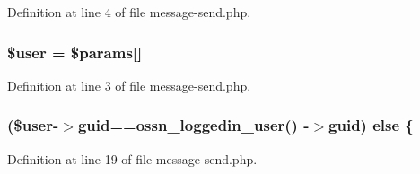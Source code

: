 Definition at line 4 of file message-\/send.\+php.

\subsubsection[{\texorpdfstring{\$user}{$user}}]{\setlength{\rightskip}{0pt plus 5cm}\${\bf user} = \$params\mbox{[}\textquotesingle{}\mbox{]}}\hypertarget{message-send_8php_a598ca4e71b15a1313ec95f0df1027ca5}{}\label{message-send_8php_a598ca4e71b15a1313ec95f0df1027ca5}


Definition at line 3 of file message-\/send.\+php.

\subsubsection[{\texorpdfstring{else}{else}}]{ (\${\bf user}-\/$>$guid=={\bf ossn\+\_\+loggedin\+\_\+user}() -\/$>$guid) else \{}\hypertarget{message-send_8php_a5ab30da07348e5b39dc43c2afa6631c2}{}\label{message-send_8php_a5ab30da07348e5b39dc43c2afa6631c2}


Definition at line 19 of file message-\/send.\+php.

